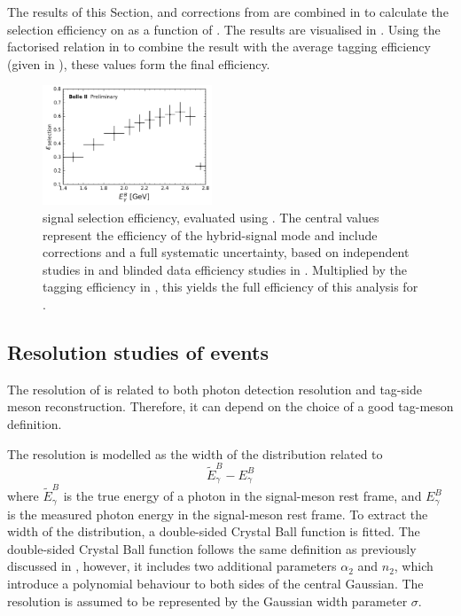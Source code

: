 The results of this Section,  and corrections from 
are combined in  to calculate the selection efficiency on \BtoXsgamma as a function of \EB.
The results are visualised in .
Using the factorised relation in  to combine the result with the average \FEI tagging efficiency (given in ), these values form the final
efficiency.

\begin{figure}[htbp!]  
    \centering
    \includegraphics[width=0.45\textwidth]{figures/signal_validation/corrected_selection_efficiency.pdf}
    \caption{\label{fig:corrected_signal_efficiency} \BtoXsgamma signal selection efficiency, evaluated using .
    The central values represent the efficiency of the hybrid-signal mode and include corrections and a full systematic uncertainty,
    based on independent studies in  and blinded data efficiency studies in .
    Multiplied by the \FEI tagging efficiency in , this yields the full efficiency of this analysis for \BtoXsgamma.
    }
\end{figure}

\subsection{Resolution studies of \texorpdfstring{\BtoXsgamma}{B->Xs gamma} events}\label{sec:resolution_studies}

The resolution of \EB is related to both photon detection resolution and tag-side \B meson reconstruction.
Therefore, it can depend on the choice of a good tag-\B meson definition.

The resolution is modelled as the width of the distribution related to
\begin{equation}\label{eq:resolution}
    \tilde{E}_{\gamma}^{B} - E_{\gamma}^{B}
\end{equation}
where $\tilde{E}_{\gamma}^{B}$ is the true energy of a photon in the signal-\B meson rest frame,
and $E_{\gamma}^{B}$ is the measured photon energy in the signal-\B meson rest frame.
To extract the width of the distribution, a double-sided Crystal Ball function is fitted.
The double-sided Crystal Ball function follows the same definition as previously discussed in ,
however, it includes two additional parameters $\alpha_2$ and $n_2$, which introduce a polynomial behaviour to both sides of the central Gaussian.
The resolution is assumed to be represented by the Gaussian width parameter $\sigma$.

